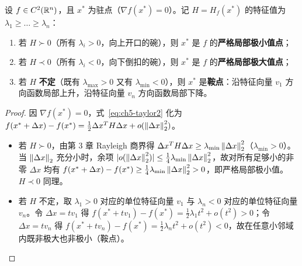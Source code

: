 \begin{thmBox}
\begin{proposition}[驻点处的二阶充分条件与鞍点判别]\label{prop:ch5-second-order}
设 $f\in C^2(\mathbb{R}^n)$，且 $x^*$ 为驻点（$\nabla f(x^*) = 0$）。记 $H = H_f(x^*)$ 的特征值为 $\lambda_1 \ge \dots \ge \lambda_n$：
\begin{enumerate}
  \item 若 $H \succ 0$（所有 $\lambda_i > 0$，向上开口的碗），则 $x^*$ 是 $f$ 的\textbf{严格局部极小值点}；
  \item 若 $H \prec 0$（所有 $\lambda_i < 0$，向下倒扣的碗），则 $x^*$ 是 $f$ 的\textbf{严格局部极大值点}；
  \item 若 $H$ \textbf{不定}（既有 $\lambda_{\max}>0$ 又有 $\lambda_{\min}<0$），则 $x^*$ 是\textbf{鞍点}：沿特征向量 $v_1$ 方向函数局部上升，沿特征向量 $v_n$ 方向函数局部下降。
\end{enumerate}
\end{proposition}
\end{thmBox}

\begin{proof}
因 $\nabla f(x^*) = 0$，式~\eqref{eq:ch5-taylor2} 化为 $f(x^*+\Delta x) - f(x^*) = \frac{1}{2}\Delta x^T H \Delta x + o(\left\|\Delta x\right\|_2^2)$。
\begin{itemize}
  \item 若 $H \succ 0$，由第 3 章 Rayleigh 商界得 $\Delta x^T H \Delta x \ge \lambda_{\min}\left\|\Delta x\right\|_2^2$（$\lambda_{\min}>0$）。当 $\left\|\Delta x\right\|_2$ 充分小时，余项 $|o(\left\|\Delta x\right\|_2^2)| \le \frac{1}{4}\lambda_{\min}\left\|\Delta x\right\|_2^2$，故对所有足够小的非零 $\Delta x$ 均有 $f(x^*+\Delta x) - f(x^*) \ge \frac{1}{4}\lambda_{\min}\left\|\Delta x\right\|_2^2 > 0$，即严格局部极小值。$H\prec 0$ 同理。
  \item 若 $H$ 不定，取 $\lambda_1>0$ 对应的单位特征向量 $v_1$ 与 $\lambda_n<0$ 对应的单位特征向量 $v_n$。令 $\Delta x = t v_1$ 得 $f(x^*+t v_1) - f(x^*) = \frac{1}{2}\lambda_1 t^2 + o(t^2) > 0$；令 $\Delta x = t v_n$ 得 $f(x^*+t v_n) - f(x^*) = \frac{1}{2}\lambda_n t^2 + o(t^2) < 0$，故在任意小邻域内既非极大也非极小（鞍点）。
\end{itemize}
\end{proof}

